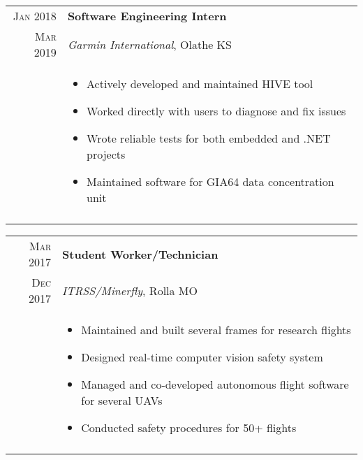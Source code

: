 \documentclass[a4paper,10pt]{article}
\newcommand{\br}{\\\multicolumn{2}{c}{}}
\begin{document}
\begin{tabular}{r|p{15cm}}
    \textsc{Jan 2018} & \textbf{Software Engineering Intern} \\
    \textsc{Mar 2019} & \textit{Garmin International}, Olathe KS \\ &
    \begin{itemize}
    \item Actively developed and maintained HIVE tool
    \item Worked directly with users to diagnose and fix issues
    \item Wrote reliable tests for both embedded and .NET projects
    \item Maintained software for GIA64 data concentration unit

    \end{itemize} \br\\

\end{tabular}

\begin{tabular}{r|p{15cm}}
    \textsc{Mar 2017} & \textbf{Student Worker/Technician} \\
    \textsc{Dec 2017} & \textit{ITRSS/Minerfly}, Rolla MO \\ &
    \begin{itemize}
    \item Maintained and built several frames for research flights
    \item Designed real-time computer vision safety system
    \item Managed and co-developed autonomous flight software for several UAVs
    \item Conducted safety procedures for 50+ flights

    \end{itemize} \br\\

\end{tabular}
\end{document}
